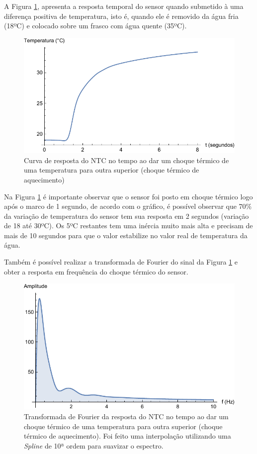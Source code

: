 \documentclass[a4paper]{instrumentacao}
\begin{document}
A Figura \ref{fig:ntc-choque-acima-tempo}, apresenta a resposta temporal do sensor quando submetido à uma diferença positiva de temperatura, isto é, quando ele é removido da água fria (18ºC) e colocado sobre um frasco com água quente (35ºC).

\begin{figure}[H]
\center
\includegraphics[width=\textwidth]{ThermalShock-Up-Time.pdf}
\caption{Curva de resposta do NTC no tempo ao dar um choque térmico de uma temperatura para outra superior (choque térmico de aquecimento)}
\label{fig:ntc-choque-acima-tempo}
\end{figure}

Na Figura \ref{fig:ntc-choque-acima-tempo} é importante observar que o sensor foi posto em choque térmico logo após o marco de 1 segundo, de acordo com o gráfico, é possível observar que 70\% da variação de temperatura do sensor tem sua resposta em 2 segundos (variação de 18 até 30ºC). Os 5ºC restantes tem uma inércia muito mais alta e precisam de mais de 10 segundos para que o valor estabilize no valor real de temperatura da água.

Também é possível realizar a transformada de Fourier do sinal da Figura \ref{fig:ntc-choque-acima-tempo} e obter a resposta em frequência do choque térmico do sensor.

\begin{figure}[H]
\center
\includegraphics[width=\textwidth]{ThermalShock-Up-Frequency.pdf}
\caption{Transformada de Fourier da resposta do NTC no tempo ao dar um choque térmico de uma temperatura para outra superior (choque térmico de aquecimento). Foi feito uma interpolação utilizando uma \textit{Spline} de 10ª ordem para suavizar o espectro.}
\label{fig:ntc-choque-acima-frequencia}
\end{figure}
\end{document}
